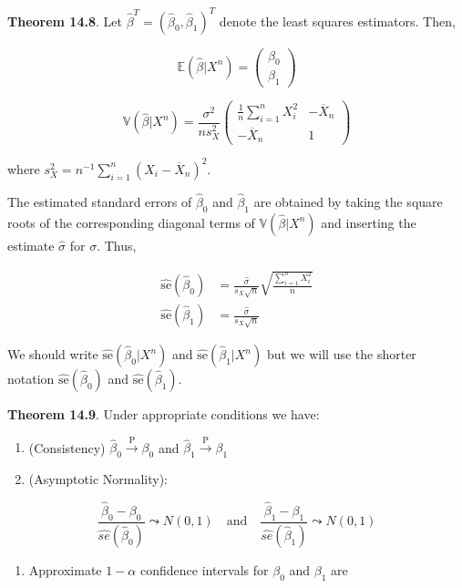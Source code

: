 \textbf{Theorem 14.8}. Let
\(\hat{\beta}^T = (\hat{\beta}_{0}, \hat{\beta}_{1})^T\) denote the least
squares estimators. Then,

\[
\mathbb{E}(\hat{\beta} | X^{n}) = \begin{pmatrix}\beta_{0} \\ \beta_{1} \end{pmatrix}
\]

\[
\mathbb{V}(\hat{\beta} | X^{n}) = \frac{\sigma^{2}}{n s_X^{2}} \begin{pmatrix} 
\frac{1}{n} \sum_{i=1}^{n} X_{i}^{2} & -\overline{X}_{n} \\
-\overline{X}_{n} & 1
\end{pmatrix}
\]

where \(s_X^{2} = n^{-1} \sum_{i=1}^{n} (X_{i} - \overline{X}_{n})^{2}\).

The estimated standard errors of \(\hat{\beta}_{0}\) and \(\hat{\beta}_{1}\)
are obtained by taking the square roots of the corresponding diagonal
terms of \(\mathbb{V}(\hat{\beta} | X^{n})\) and inserting the estimate
\(\hat{\sigma}\) for \(\sigma\). Thus,

\begin{align*}
\hat{\text{se}}(\hat{\beta}_{0}) &= \frac{\hat{\sigma}}{s_X \sqrt{n}} \sqrt{\frac{\sum_{i=1}^{n} X_{i}^{2}}{n}}\\
\hat{\text{se}}(\hat{\beta}_{1}) &= \frac{\hat{\sigma}}{s_X \sqrt{n}}
\end{align*}

We should write \(\hat{\text{se}}(\hat{\beta}_{0} | X^{n})\) and
\(\hat{\text{se}}(\hat{\beta}_{1} | X^{n})\) but we will use the shorter
notation \(\hat{\text{se}}(\hat{\beta}_{0})\) and
\(\hat{\text{se}}(\hat{\beta}_{1})\).

\textbf{Theorem 14.9}. Under appropriate conditions we have:

\begin{enumerate}[label={\arabic*.}]
\item
  (Consistency) \(\hat{\beta}_{0} \xrightarrow{\text{P}} \beta_{0}\) and
  \(\hat{\beta}_{1} \xrightarrow{\text{P}} \beta_{1}\)
\item
  (Asymptotic Normality):
\end{enumerate}

\[
\frac{\hat{\beta}_{0} - \beta_{0}}{\hat{se}(\hat{\beta}_{0})} \leadsto N(0, 1)
\quad \text{and} \quad
\frac{\hat{\beta}_{1} - \beta_{1}}{\hat{se}(\hat{\beta}_{1})} \leadsto N(0, 1)
\]

\begin{enumerate}[tightlist,label={\arabic*.},resume]
\item
  Approximate \(1 - \alpha\) confidence intervals for \(\beta_{0}\) and
  \(\beta_{1}\) are
\end{enumerate}

